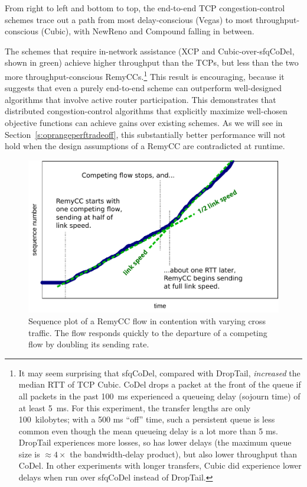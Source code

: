 From right to left and bottom to top, the end-to-end TCP
congestion-control schemes trace out a path from most delay-conscious
(Vegas) to most throughput-conscious (Cubic), with NewReno and Compound
falling in between.

The schemes that require in-network assistance (XCP and
Cubic-over-sfqCoDel, shown in green) achieve higher throughput than
the TCPs, but less than the two more throughput-conscious
RemyCCs.\footnote{It may seem surprising that sfqCoDel, compared with
  DropTail, \emph{increased} the median RTT of TCP Cubic. CoDel drops
  a packet at the front of the queue if all packets in the past 100~ms
  experienced a queueing delay (sojourn time) of at least 5~ms. For
  this experiment, the transfer lengths are only 100~kilobytes; with a
  500 ms ``off'' time, such a persistent queue is less common even
  though the mean queueing delay is a lot more than 5 ms. DropTail
  experiences more losses, so has lower delays (the maximum queue size
  is $\approx 4\times$ the bandwidth-delay product), but also lower
  throughput than CoDel. In other experiments with longer transfers,
  Cubic did experience lower delays when run over sfqCoDel instead of
  DropTail.} This result is encouraging, because it suggests that even
a purely end-to-end scheme can outperform well-designed algorithms
that involve active router participation.  This demonstrates that
distributed congestion-control algorithms that explicitly maximize
well-chosen objective functions can achieve gains over existing
schemes.  As we will see in Section~\ref{s:oprangeperftradeoff}, this
substantially better performance will not hold when the design
assumptions of a RemyCC are contradicted at runtime.

\begin{figure}
\includegraphics[width=\columnwidth]{trace.pdf}
\caption{Sequence plot of a RemyCC flow in contention with varying
  cross traffic. The flow responds quickly to the departure of a
  competing flow by doubling its sending rate.}
\label{f:trace}
\end{figure}

